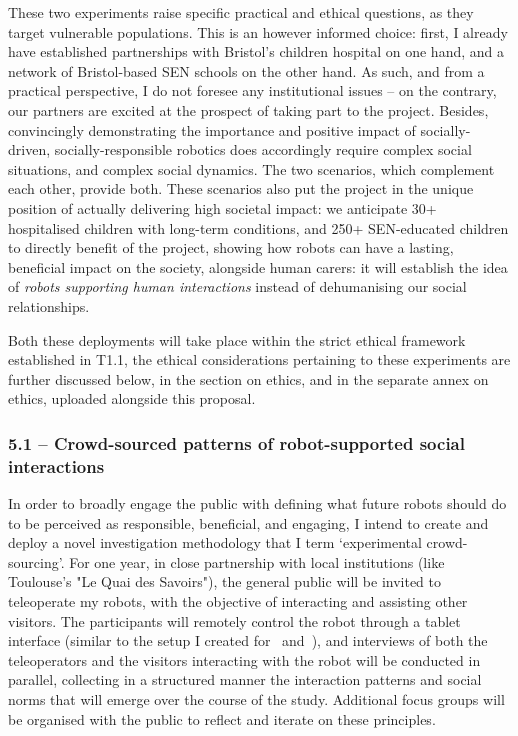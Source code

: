 These two experiments raise specific practical and ethical questions, as they
target vulnerable populations. This is an however informed choice: first, I
already have established partnerships with Bristol's children hospital on one
hand, and a network of Bristol-based SEN schools on the other hand. As such, and
from a practical perspective, I do not foresee any institutional issues -- on
the contrary, our partners are excited at the prospect of taking part to the
project. Besides, convincingly demonstrating the importance and positive impact
of socially-driven, socially-responsible robotics does accordingly require
complex social situations, and complex social dynamics. The two scenarios, which
complement each other, provide both. These scenarios also put the project in the
unique position of actually delivering high societal impact: we anticipate 30+
hospitalised children with long-term conditions, and 250+ SEN-educated children
to directly benefit of the project, showing how robots can have a lasting,
beneficial impact on the society, alongside human carers: it will establish the
idea of \emph{robots supporting human interactions} instead of dehumanising our
social relationships.

Both these deployments will take place within the strict ethical framework
established in T1.1, the ethical considerations pertaining to these experiments
are further discussed below, in the section on ethics, and in the separate annex
on ethics, uploaded alongside this proposal.


\subsubsection{5.1 -- Crowd-sourced patterns of robot-supported social
interactions}

In order to broadly engage the public with defining what future robots should do
to be perceived as responsible, beneficial, and engaging, I intend to create and
deploy a novel investigation methodology that I term `experimental
crowd-sourcing'. For one year, in close partnership with local institutions
(like Toulouse's "Le Quai des Savoirs"), the general public will be invited to
teleoperate my robots, with the objective of interacting and assisting
other visitors. The participants will remotely control the robot through a
tablet interface (similar to the setup I created
for~\parencite{senft2019teaching} and~\parencite{winkle2020insitu}), and
interviews of both the teleoperators and the visitors interacting with the robot
will be conducted in parallel, collecting in a structured manner the interaction
patterns and social norms that will emerge over the course of the study.
Additional focus groups will be organised with the public to reflect and
iterate on these principles.

